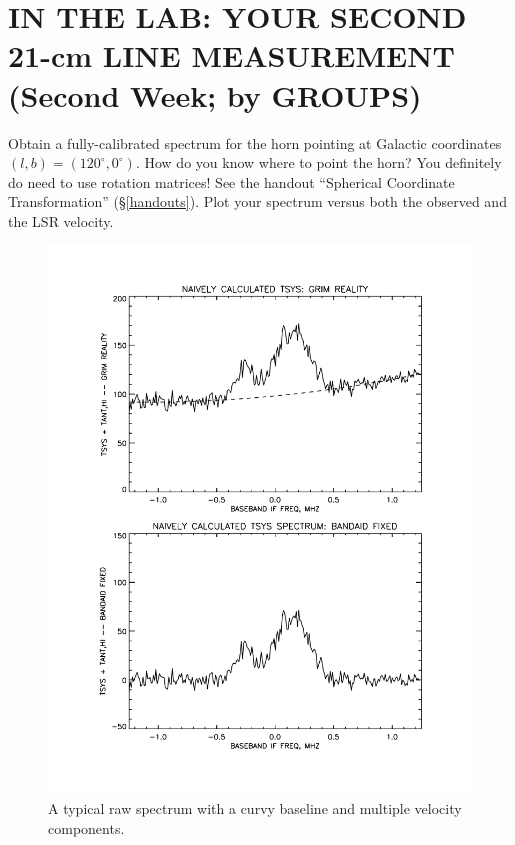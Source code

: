\documentclass[12pt,preprint]{aastex}
\begin{document}
\section{IN THE LAB: YOUR SECOND 21-cm LINE MEASUREMENT (Second Week; by
  GROUPS)} 
\label{meas2}

Obtain a fully-calibrated spectrum for the horn pointing at Galactic
coordinates $(l,b)=(120^\circ, 0^\circ)$. How do you know where to point
the horn? You definitely do need to use rotation matrices!  See the
handout ``Spherical Coordinate Transformation''
(\S \ref{handouts}). Plot your spectrum versus both the observed and
the LSR velocity. 

\begin{figure}[h!]
\begin{center}
%       
\includegraphics[scale=0.5]{bmp_cal1.pdf}
\end{center}
\vspace{-0.3in}
\caption{\footnotesize A typical raw spectrum with a curvy baseline and
  multiple velocity components. \label{rawspect}}
\end{figure}
\end{document}
